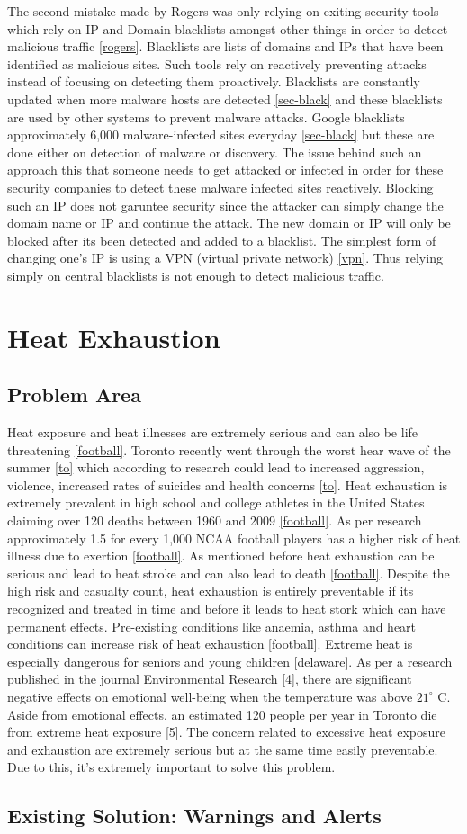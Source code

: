 \documentclass{article}
\begin{document}
The second mistake made by Rogers was only relying on exiting security tools which rely on IP and Domain blacklists amongst other things in order to detect malicious traffic \ref{rogers}. Blacklists are lists of domains and IPs that have been identified as malicious sites. Such tools rely on reactively preventing attacks instead of focusing on detecting them proactively. Blacklists are constantly updated when more malware hosts are detected \ref{sec-black} and these blacklists are used by other systems to prevent malware attacks. Google blacklists approximately 6,000 malware-infected sites everyday \ref{sec-black} but these are done either on detection of malware or discovery. The issue behind such an approach this that someone needs to get attacked or infected in order for these security companies to detect these malware infected sites reactively. Blocking such an IP does not garuntee security since the attacker can simply change the domain name or IP and continue the attack. The new domain or IP will only be blocked after its been detected and added to a blacklist. The simplest form of changing one's IP is using a VPN (virtual private network) \ref{vpn}. Thus relying simply on central blacklists is not enough to detect malicious traffic.

\section{Heat Exhaustion}
\subsection{Problem Area}
Heat exposure and heat illnesses are extremely serious and can also be life threatening \ref{football}. Toronto recently went through the worst hear wave of the summer \ref{to} which according to research could lead to increased aggression, violence, increased rates of suicides and health concerns \ref{to}. Heat exhaustion is extremely prevalent in high school and college athletes in the United States claiming over 120 deaths between 1960 and 2009 \ref{football}. As per research approximately 1.5 for every 1,000 NCAA football players has a higher risk of heat illness due to exertion \ref{football}. As mentioned before heat exhaustion can be serious and lead to heat stroke and can also lead to death \ref{football}. Despite the high risk and casualty count, heat exhaustion is entirely preventable if its recognized and treated in time and before it leads to heat stork which can have permanent effects. Pre-existing conditions like anaemia, asthma and heart conditions can increase risk of heat exhaustion \ref{football}. Extreme heat is especially dangerous for seniors and young children \ref{delaware}. As per a research published in the journal Environmental Research [4], there are significant negative effects on emotional well-being when the temperature was above $21^\circ$ C. Aside from emotional effects, an estimated 120 people per year in Toronto die from extreme heat exposure [5]. The concern related to excessive heat exposure and exhaustion are extremely serious but at the same time easily preventable. Due to this, it's extremely important to solve this problem.

\subsection{Existing Solution: Warnings and Alerts}
\end{document}
